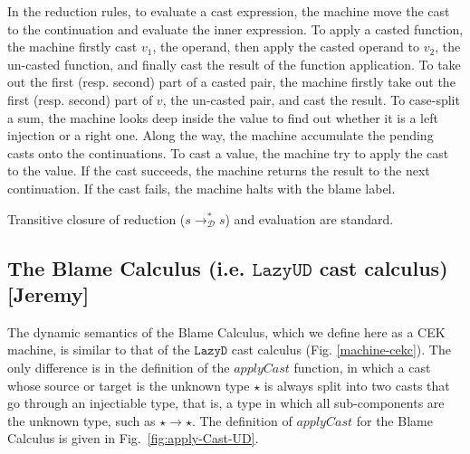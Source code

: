 \documentclass[acmsmall,review,anonymous]{acmart}\settopmatter{printfolios=true,printccs=false,printacmref=false}
\newcommand{\lazyUD}{$\mathtt{Lazy UD}$}
\newcommand{\lazyD}{$\mathtt{Lazy D}$}
\newcommand{\judgeDBreduceTrans}[2]{#1 \longrightarrow_{\mathcal{D}}^{*} #2}
\begin{document}
In the reduction rules, to evaluate a cast expression, the machine move the 
cast to the continuation and evaluate the inner expression. To apply a casted 
function, the machine firstly cast $ v_1 $, the operand, then apply the casted 
operand to $ v_2 $, the un-casted function, and finally cast the result of the 
function application. To take out the first (resp. second) part of a casted 
pair, the machine firstly take out the first (resp. second) part of $ v $, the 
un-casted pair, and cast the result. To case-split a sum, the machine looks 
deep inside the value to find out whether it is a left injection or a right 
one.
Along the way, the machine accumulate the pending casts onto the 
continuations. To cast a value, the machine try to apply the cast to the value. 
If the cast succeeds, the machine returns the result to the next continuation. 
If the cast fails, the machine halts with the blame label.

Transitive closure of reduction ($ \judgeDBreduceTrans{s}{s} $) and evaluation 
are 
standard.

\subsection{The Blame Calculus (i.e. \lazyUD{} cast calculus) [Jeremy]}

The dynamic semantics of the Blame Calculus, which we define here as a
CEK machine, is similar to that of the \lazyD{} cast calculus
(Fig. \ref{machine-cekc}). The only difference is in the definition of
the $\mathit{applyCast}$ function, in which a cast whose source or
target is the unknown type $\star$ is always split into two casts that
go through an injectiable type, that is, a type in which all
sub-components are the unknown type, such as $\star \to \star$. The
definition of $\mathit{applyCast}$ for the Blame Calculus is given in
Fig.~\ref{fig:apply-Cast-UD}.
\end{document}
